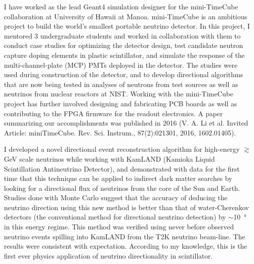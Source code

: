 \documentclass[10pt]{article} %
\begin{document}
I have worked as the lead Geant4 simulation designer for the
mini-TimeCube collaboration at University of Hawaii at Manoa. mini-TimeCube is
an ambitious project to build the world's smallest portable neutrino detector.
In this project, I mentored 3 undergraduate students and worked in
collaboration with them to conduct case studies for optimizing the detector
design, test candidate neutron capture doping elements in plastic scintillator,
and simulate the response of the multi-channel-plate (MCP) PMTs deployed in the
detector. The studies were used during construction of the detector, and to
develop directional algorithms that are now being tested in analyses of
neutrons from test sources as well as neutrinos from nuclear reactors at NIST.
Working with the mini-TimeCube project has further involved designing and
fabricating PCB boards as well as contributing to the FPGA firmware for the
readout electronics. A paper summarizing our accomplishments was published in
2016 (V. A. Li et al. Invited Article: miniTimeCube. Rev. Sci. Instrum.,
87(2):021301, 2016, 1602.01405).

I developed a novel directional event reconstruction algorithm for high-energy
$\gtrsim$\si{\giga\electronvolt} scale neutrinos while working with KamLAND
(Kamioka Liquid Scintillation Antineutrino Detector), and demonstrated with
data for the first time that this technique can be applied to indirect dark
matter searches by looking for a directional flux of neutrinos from the core of
the Sun and Earth. Studies done with Monte Carlo suggest that the accuracy of
deducing the neutrino direction using this new method is better than that of
water-Cherenkov detectors (the conventional method for directional neutrino
detection) by $\sim$\SI{10}{\degree} in this energy regime. This method was
verified using never before observed neutrino events spilling into KamLAND from
the T2K neutrino beam-line. The results were consistent with expectation.
According to my knowledge, this is the first ever physics application of
neutrino directionality in scintillator.
\end{document}
